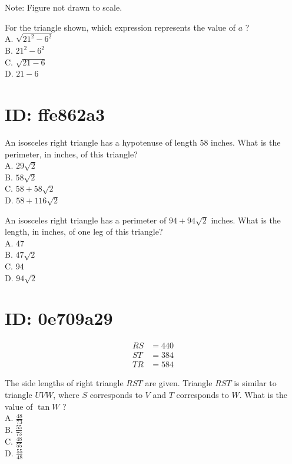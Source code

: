 




Note: Figure not drawn to scale.

For the triangle shown, which expression represents the value of $a$ ?\\
A. $\sqrt{21^{2}-6^{2}}$\\
B. $21^{2}-6^{2}$\\
C. $\sqrt{21-6}$\\
D. $21-6$















\section*{ID: ffe862a3}
An isosceles right triangle has a hypotenuse of length 58 inches. What is the perimeter, in inches, of this triangle?\\
A. $29 \sqrt{2}$\\
B. $58 \sqrt{2}$\\
C. $58+58 \sqrt{2}$\\
D. $58+116 \sqrt{2}$

An isosceles right triangle has a perimeter of $94+94 \sqrt{2}$ inches. What is the length, in inches, of one leg of this triangle?\\
A. 47\\
B. $47 \sqrt{2}$\\
C. 94\\
D. $94 \sqrt{2}$

\section*{ID: 0e709a29}
$$
\begin{aligned}
R S & =440 \\
S T & =384 \\
T R & =584
\end{aligned}
$$

The side lengths of right triangle $R S T$ are given. Triangle $R S T$ is similar to triangle $U V W$, where $S$ corresponds to $V$ and $T$ corresponds to $W$. What is the value of $\tan W$ ?\\
A. $\frac{48}{73}$\\
B. $\frac{55}{73}$\\
C. $\frac{48}{55}$\\
D. $\frac{55}{48}$

